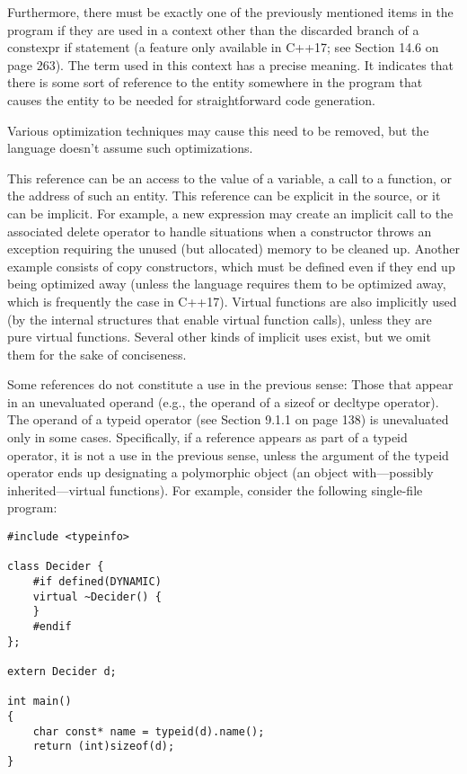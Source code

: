 Furthermore, there must be exactly one of the previously mentioned items in the program if they are used in a context other than the discarded branch of a constexpr if statement (a feature only available in C++17; see Section 14.6 on page 263). The term used in this context has a precise meaning. It indicates that there is some sort of reference to the entity somewhere in the program that causes the entity to be needed for straightforward code generation.

\begin{tcolorbox}[colback=webgreen!5!white,colframe=webgreen!75!black]
\hspace*{0.75cm}Various optimization techniques may cause this need to be removed, but the language doesn’t assume such optimizations.
\end{tcolorbox}

This reference can be an access to the value of a variable, a call to a function, or the address of such an entity. This reference can be explicit in the source, or it can be implicit. For example, a new expression may create an implicit call to the associated delete operator to handle situations when a constructor throws an exception requiring the unused (but allocated) memory to be cleaned up. Another example consists of copy constructors, which must be defined even if they end up being optimized away (unless the language requires them to be optimized away, which is frequently the case in C++17). Virtual functions are also implicitly used (by the internal structures that enable virtual function calls), unless they are pure virtual functions. Several other kinds of implicit uses exist, but we omit them for the sake of conciseness.

Some references do not constitute a use in the previous sense: Those that appear in an unevaluated operand (e.g., the operand of a sizeof or decltype operator). The operand of a typeid operator (see Section 9.1.1 on page 138) is unevaluated only in some cases. Specifically, if a reference appears as part of a typeid operator, it is not a use in the previous sense, unless the argument of the typeid operator ends up designating a polymorphic object (an object with—possibly inherited—virtual functions). For example, consider the following single-file program:

\begin{lstlisting}[style=styleCXX]
#include <typeinfo>

class Decider {
	#if defined(DYNAMIC)
	virtual ~Decider() {
	}
	#endif
};

extern Decider d;

int main()
{
	char const* name = typeid(d).name();
	return (int)sizeof(d);
}
\end{lstlisting}

